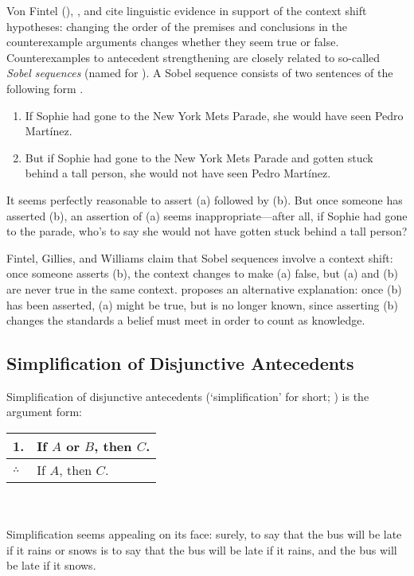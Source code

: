 Von Fintel (), \citet{Gillies2007-GILCS}, and \citet{Williams2008-WILCAC-2} cite linguistic evidence in support of the context shift hypotheses: changing the order of the premises and conclusions in the counterexample arguments changes whether they seem true or false. Counterexamples to antecedent strengthening are closely related to so-called \emph{Sobel sequences} (named for \citealt{Sobel1970-SOBUSA}).  A Sobel sequence consists of two sentences of the following form \citep{Gillies2007-GILCS}.
\begin{enumerate}
\renewcommand{\labelenumi}{(\alph{enumi})}
\item If Sophie had gone to the New York Mets Parade, she would have seen Pedro Mart\'inez.
\item But if Sophie had gone to the New York Mets Parade and gotten stuck behind a tall person, she would not have seen Pedro Mart\'inez.
\end{enumerate}
It seems perfectly reasonable to assert (a) followed by (b).  But once someone has asserted (b), an assertion of (a) seems inappropriate---after all, if Sophie had gone to the parade, who's to say she would not have gotten stuck behind a tall person?

Fintel, Gillies, and Williams claim that Sobel sequences involve a context shift: once someone asserts (b), the context changes to make (a) false, but (a) and (b) are never true in the same context.   \citet{Moss2012-MOSOTP} proposes an alternative explanation: once (b) has been asserted, (a) might be true, but is no longer known, since asserting (b) changes the standards a belief must meet in order to count as knowledge.

\subsection{Simplification of Disjunctive Antecedents}

Simplification of disjunctive antecedents (`simplification' for short; \citealp{Nute1975-NUTCAT-2}) is the argument form:\smallskip\\
\begin{tabular}{ll}
1. & If $A$ or $B$, then $C$.\\
\hline
$\therefore$ & If $A$, then $C$.
\end{tabular}\\\smallskip\\
Simplification seems appealing on its face: surely, to say that the bus will be late if it rains or snows is to say that the bus will be late if it rains, and the bus will be late if it snows.

